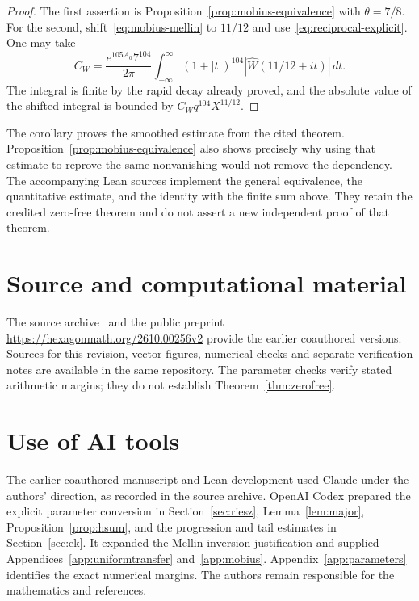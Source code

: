 \documentclass[screen,reqno]{aomart}
\numberwithin{equation}{section}
\theoremstyle{definition}
\begin{document}
\begin{proof}
The first assertion is Proposition~\ref{prop:mobius-equivalence} with
$\theta=7/8$. For the second, shift~\eqref{eq:mobius-mellin} to $11/12$
and use~\eqref{eq:reciprocal-explicit}. One may take
\[
 C_W=\frac{e^{105A_0}7^{104}}{2\pi}
       \int_{-\infty}^{\infty}(1+|t|)^{104}
       |\widehat W(11/12+it)|\,dt.
\]
The integral is finite by the rapid decay already proved, and the absolute
value of the shifted integral is bounded by $C_Wq^{104}X^{11/12}$.
\end{proof}

The corollary proves the smoothed estimate from the cited theorem.
Proposition~\ref{prop:mobius-equivalence} also shows precisely why using
that estimate to reprove the same nonvanishing would not remove the
dependency. The accompanying Lean sources implement the general equivalence,
the quantitative estimate, and the identity with the finite sum above.
They retain the credited zero-free theorem and do not assert a new
independent proof of that theorem.

\section*{Source and computational material}
The source archive~\cite{BB26code} and the public preprint
\url{https://hexagonmath.org/2610.00256v2} provide the earlier coauthored
versions. Sources for this revision, vector figures, numerical checks and
separate verification notes are available in the same repository. The
parameter checks verify stated arithmetic margins; they do not establish
Theorem~\ref{thm:zerofree}.

\section*{Use of AI tools}
The earlier coauthored manuscript and Lean development used Claude under
the authors' direction, as recorded in the source archive. OpenAI Codex
prepared the explicit parameter conversion in Section~\ref{sec:riesz},
Lemma~\ref{lem:major}, Proposition~\ref{prop:hsum}, and the progression and
tail estimates in Section~\ref{sec:ek}. It expanded the Mellin inversion
justification and supplied Appendices~\ref{app:uniformtransfer}
and~\ref{app:mobius}.
Appendix~\ref{app:parameters} identifies the exact numerical margins.
The authors remain responsible for the mathematics and references.
\end{document}
